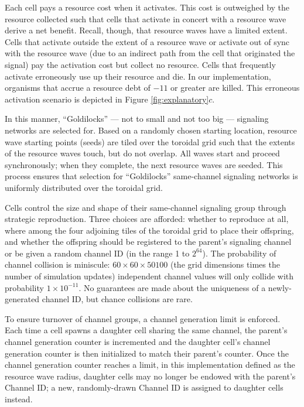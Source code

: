 Each cell pays a resource cost when it activates.
This cost is outweighed by the resource collected such that cells that activate in concert with a resource wave derive a net benefit.
Recall, though, that resource waves have a limited extent.
Cells that activate outside the extent of a resource wave or activate out of sync with the resource wave (due to an indirect path from the cell that originated the signal) pay the activation cost but collect no resource.
Cells that frequently activate erroneously use up their resource and die.
In our implementation, organisms that accrue a resource debt of $-11$ or greater are killed.
This erroneous activation scenario is depicted in Figure \ref{fig:explanatory}$c$.

In this manner, ``Goldilocks'' --- not to small and not too big --- signaling networks are selected for.
Based on a randomly chosen starting location, resource wave starting points (seeds) are tiled over the toroidal grid such that the extents of the resource waves touch, but do not overlap.
All waves start and proceed synchronously;
when they complete, the next resource waves are seeded.
This process ensures that selection for ``Goldilocks'' same-channel signaling networks is uniformly distributed over the toroidal grid.

Cells control the size and shape of their same-channel signaling group through strategic reproduction.
Three choices are afforded: whether to reproduce at all, where among the four adjoining tiles of the toroidal grid to place their offspring, and whether the offspring should be registered to the parent's signaling channel or be given a random channel ID (in the range 1 to $2^{64}$).
The probability of channel collision is miniscule: $60 \times 60 \times 50100$ (the grid dimensions times the number of simulation updates) independent channel values will only collide with probability $1 \times 10^{-11}$.
No guarantees are made about the uniqueness of a newly-generated channel ID, but chance collisions are rare.

To ensure turnover of channel groups, a channel generation limit is enforced.
Each time a cell spawns a daughter cell sharing the same channel, the parent's channel generation counter is incremented and the daughter cell's channel generation counter is then initialized to match their  parent's counter.
Once the channel generation counter reaches a limit, in this implementation defined as the resource wave radius, daughter cells may no longer be endowed with the parent's Channel ID; a new, randomly-drawn Channel ID is assigned to daughter cells instead.

